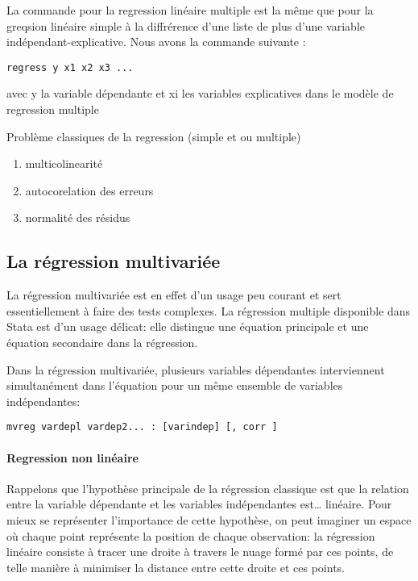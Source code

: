 \documentclass[
]{book}
\providecommand{\tightlist}{%
  \setlength{\itemsep}{0pt}\setlength{\parskip}{0pt}}
\begin{document}
La commande pour la regression linéaire multiple est la même que pour la greqsion linéaire simple à la diffrérence d'une liste de plus d'une variable indépendant-explicative. Nous avons la commande suivante :

\texttt{regress\ y\ x1\ x2\ x3\ ...}

avec y la variable dépendante et xi les variables explicatives dans le modèle de regression multiple

Problème classiques de la regression (simple et ou multiple)

\begin{enumerate}
\def\labelenumi{(\arabic{enumi})}
\tightlist
\item
  multicolinearité
\item
  autocorelation des erreurs
\item
  normalité des résidus
\end{enumerate}

\hypertarget{la-ruxe9gression-multivariuxe9e}{%
\subsection{La régression multivariée}\label{la-ruxe9gression-multivariuxe9e}}

La régression multivariée est en effet d'un
usage peu courant et sert essentiellement à faire des tests
complexes. La régression multiple disponible dans Stata est d'un
usage délicat: elle distingue une équation principale et une
équation secondaire dans la régression.

Dans la régression multivariée, plusieurs variables dépendantes
interviennent simultanément dans l'équation pour un même
ensemble de variables indépendantes:

\texttt{mvreg\ vardepl\ vardep2...\ :\ {[}varindep{]}\ {[},\ corr\ {]}}

\hypertarget{regression-non-linuxe9aire}{%
\paragraph{Regression non linéaire}\label{regression-non-linuxe9aire}}

Rappelons que l'hypothèse principale de la régression classique
est que la relation entre la variable dépendante et les variables
indépendantes est\ldots{} linéaire. Pour mieux se représenter
l'importance de cette hypothèse, on peut imaginer un espace où
chaque point représente la position de chaque observation: la
régression linéaire consiste à tracer une droite à travers le nuage
formé par ces points, de telle manière à minimiser la distance
entre cette droite et ces points.
\end{document}
